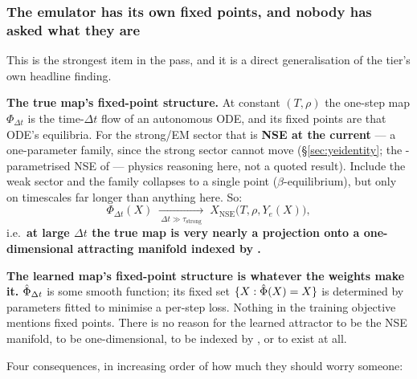 \subsubsection{The emulator has its own fixed points, and nobody has asked what they are}
\label{sec:fixedpoints}

This is the strongest item in the pass, and it is a direct generalisation of the
tier's own headline finding.

\textbf{The true map's fixed-point structure.} At constant $(T,\rho)$ the
one-step map $\Phi_{\Delta t}$ is the time-$\Delta t$ flow of an autonomous ODE,
and its fixed points are that ODE's equilibria. For the strong/EM sector that is
\textbf{NSE at the current \Ye} --- a one-parameter family, since the strong
sector cannot move \Ye{} (\S\ref{sec:yeidentity}; the \Ye-parametrised NSE of
\citealt{hix1996} --- physics reasoning here, not a quoted result). Include the
weak sector and the family collapses to a single point ($\beta$-equilibrium),
but only on timescales far longer than anything here. So:
%
\begin{equation}
\label{eq:nseprojection}
\Phi_{\Delta t}(X) \;\xrightarrow[\ \Delta t \gg \tau_{\text{strong}}\ ]{}\;
X_{\mathrm{NSE}}\big(T,\rho,Y_e(X)\big) ,
\end{equation}
%
i.e.\ \textbf{at large $\Delta t$ the true map is very nearly a projection onto
a one-dimensional attracting manifold indexed by \Ye.}

\textbf{The learned map's fixed-point structure is whatever the weights make
it.} $\hat\Phi_{\Delta t}$ is some smooth function; its fixed set
$\{X : \hat\Phi(X) = X\}$ is determined by parameters fitted to minimise a
per-step loss. Nothing in the training objective mentions fixed points. There is
no reason for the learned attractor to be the NSE manifold, to be
one-dimensional, to be indexed by \Ye, or to exist at all.

Four consequences, in increasing order of how much they should worry someone:

